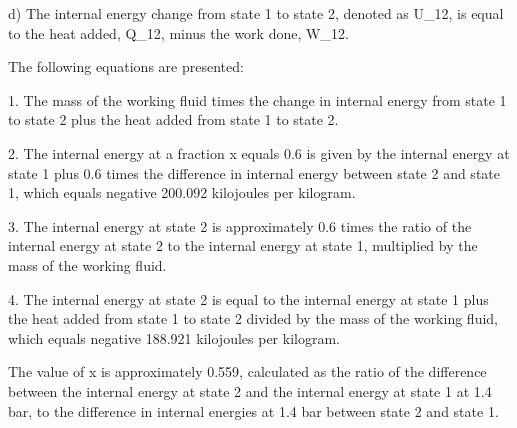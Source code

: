 d) The internal energy change from state 1 to state 2, denoted as U_12, is equal to the heat added, Q_12, minus the work done, W_12.

The following equations are presented:

1. The mass of the working fluid times the change in internal energy from state 1 to state 2 plus the heat added from state 1 to state 2.

2. The internal energy at a fraction x equals 0.6 is given by the internal energy at state 1 plus 0.6 times the difference in internal energy between state 2 and state 1, which equals negative 200.092 kilojoules per kilogram.

3. The internal energy at state 2 is approximately 0.6 times the ratio of the internal energy at state 2 to the internal energy at state 1, multiplied by the mass of the working fluid.

4. The internal energy at state 2 is equal to the internal energy at state 1 plus the heat added from state 1 to state 2 divided by the mass of the working fluid, which equals negative 188.921 kilojoules per kilogram.

The value of x is approximately 0.559, calculated as the ratio of the difference between the internal energy at state 2 and the internal energy at state 1 at 1.4 bar, to the difference in internal energies at 1.4 bar between state 2 and state 1.
